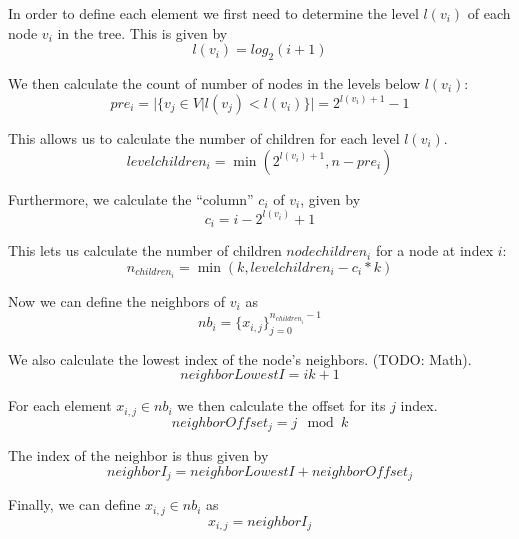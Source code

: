 In order to define each element we first need to determine the level $l(v_i)$ of each node $v_i$ in the tree. This is given by
\begin{equation}
    l(v_i) = log_2(i+1)
\end{equation}

We then calculate the count of number of nodes in the levels below $l(v_i)$:
\begin{equation}
     pre_i = \vert \{v_j \in V \vert l(v_j) < l(v_i)\} \vert = 2^{l(v_i) + 1} - 1
\end{equation}

This allows us to calculate the number of children for each level $l(v_i)$.
\begin{equation}
    levelchildren_i = \min(2^{l(v_i) + 1}, n - pre_i)
\end{equation}

Furthermore, we calculate the ``column'' $c_i$ of $v_i$, given by
\begin{equation}
    c_i = i - 2^{l(v_i)} + 1
\end{equation}

This lets us calculate the number of children $nodechildren_i$ for a node at index $i$:
\begin{equation}
    n_{children_i} = \min(k, levelchildren_i - c_i * k)
\end{equation}

Now we can define the neighbors of $v_i$ as
\begin{equation}
    nb_i = \{ x_{i, j} \}_{j=0}^{n_{children_i} - 1} 
\end{equation}

We also calculate the lowest index of the node's neighbors. (TODO: Math).
\begin{equation}
    neighborLowestI = ik + 1
\end{equation}

For each element $x_{i, j} \in nb_i$ we then calculate the offset for its $j$ index.
\begin{equation}
    neighborOffset_j = j \mod{k}
\end{equation}

The index of the neighbor is thus given by
\begin{equation}
    neighborI_j = neighborLowestI + neighborOffset_j
\end{equation}

Finally, we can define $x_{i, j} \in nb_i$ as
\begin{equation}
    x_{i, j} = neighborI_j
\end{equation}

